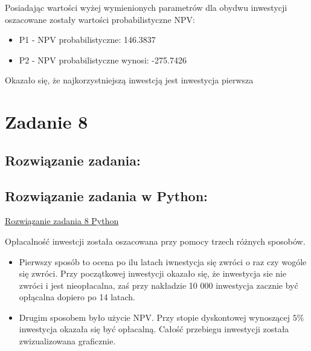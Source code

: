 \documentclass{article}
\begin{document}
		Posiadając wartości wyżej wymienionych parametrów dla obydwu inwestycji oszacowane zostały wartości probabilistyczne NPV:
		
		\begin{itemize}
			\item 
			P1 - NPV probabilistyczne: 146.3837	
			\item 
			P2 - NPV probabilistyczne wynosi: -275.7426
		\end{itemize}
			
		Okazało się, że najkorzystniejszą inwestcją jest inwestycja pierwsza
	
	\newpage
	\section*{Zadanie 8}
	
	
	\subsection*{Rozwiązanie zadania:}
	
	
	\subsection*{Rozwiązanie zadania w Python:}
	\href{https://github.com/slaw999999999/OEI/blob/main/Zadanie1.ipynb}{Rozwiązanie zadania 8 Python}
	
	Opłacalność inwestcji została oszacowana przy pomocy trzech różnych sposobów.
	\begin{itemize}
		\item 
		Pierwszy sposób to ocena po ilu latach iwnestycja się zwróci o raz czy wogóle się zwróci. Przy początkowej inwestycji okazało się, że inwestycja sie nie zwróci i jest nieopłacalna, zaś przy nakładzie 10 000 inwestycja zacznie być opłącalna dopiero po 14 latach.	
		\item 
		Drugim sposobem było użycie NPV. Przy stopie dyskontowej wynoszącej $5\%$ inwestycja okazała się być opłacalną. Całość przebiegu inwestycji została zwizualizowana graficznie.
	\end{itemize}
\end{document}
